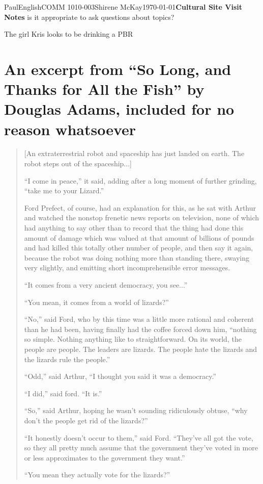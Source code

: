 \documentclass[12pt,letterpaper]{article}
\begin{document}
\begin{mla}{Paul}{English}{COMM 1010-003}{Shirene
    McKay}{\today}{\textbf{Cultural Site Visit Notes}}
is it appropriate to ask questions about topics?

The girl Kris looks to be drinking a PBR

\pagebreak
\section{An excerpt from ``So Long, and Thanks for All the Fish'' by
  Douglas Adams, included for no reason whatsoever}

\begin{quotation}
  
[An extraterrestrial robot and spaceship has just landed on earth. The
  robot steps out of the spaceship...]

``I come in peace,'' it said, adding after a long moment of further
grinding, ``take me to your Lizard.''

Ford Prefect, of course, had an explanation for this, as he sat with
Arthur and watched the nonstop frenetic news reports on television,
none of which had anything to say other than to record that the thing
had done this amount of damage which was valued at that amount of
billions of pounds and had killed this totally other number of people,
and then say it again, because the robot was doing nothing more than
standing there, swaying very slightly, and emitting short
incomprehensible error messages.

``It comes from a very ancient democracy, you see...''

``You mean, it comes from a world of lizards?''

``No,'' said Ford, who by this time was a little more rational and
coherent than he had been, having finally had the coffee forced down
him, ``nothing so simple. Nothing anything like to straightforward. On
its world, the people are people. The leaders are lizards. The people
hate the lizards and the lizards rule the people.''

``Odd,'' said Arthur, ``I thought you said it was a democracy.''

``I did,'' said ford. ``It is.''

``So,'' said Arthur, hoping he wasn't sounding ridiculously obtuse, ``why
don't the people get rid of the lizards?''

``It honestly doesn't occur to them,'' said Ford. ``They've all got the
vote, so they all pretty much assume that the government they've voted
in more or less approximates to the government they want.''

``You mean they actually vote for the lizards?''


\end{quotation}
\end{mla}
\end{document}
